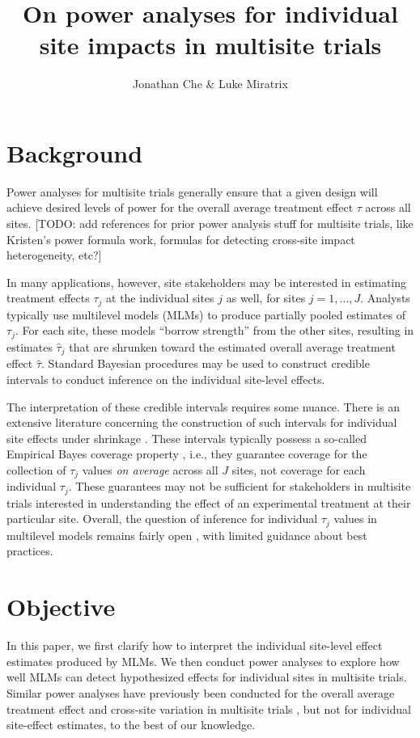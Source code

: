 \documentclass[]{article}
\title{On power analyses for individual site impacts in multisite trials}
\author{Jonathan Che \& Luke Miratrix}
\begin{document}
\maketitle


\section{Background}

Power analyses for multisite trials generally ensure that a given design will achieve desired levels of power for the overall average treatment effect $\tau$ across all sites. [TODO: add references for prior power analysis stuff for multisite trials, like Kristen’s power formula work, formulas for detecting cross-site impact heterogeneity, etc?] 

In many applications, however, site stakeholders may be interested in estimating treatment effects $\tau_j$ at the individual sites $j$ as well, for sites $j = 1, \dots, J$.
Analysts typically use multilevel models (MLMs) to produce partially pooled estimates of $\tau_j$.
For each site, these models ``borrow strength'' from the other sites, resulting in estimates $\hat{\tau}_j$ that are shrunken toward the estimated overall average treatment effect $\hat{\tau}$.
Standard Bayesian procedures may be used to construct credible intervals to conduct inference on the individual site-level effects.

The interpretation of these credible intervals requires some nuance.
There is an extensive literature concerning the construction of such intervals for individual site effects under shrinkage \citep{casella2012shrinkage}.
These intervals typically possess a so-called Empirical Bayes coverage property \citep{morris1983parametric}, i.e., they guarantee coverage for the collection of $\tau_j$ values \textit{on average} across all $J$ sites, not coverage for each individual $\tau_j$.
These guarantees may not be sufficient for stakeholders in multisite trials interested in understanding the effect of an experimental treatment at their particular site.
Overall, the question of inference for individual $\tau_j$ values in multilevel models remains fairly open \citep{armstrong2020robust}, with limited guidance about best practices.

\section{Objective}

In this paper, we first clarify how to interpret the individual site-level effect estimates produced by MLMs.
We then conduct power analyses to explore how well MLMs can detect hypothesized effects for individual sites in multisite trials.
Similar power analyses have previously been conducted for the overall average treatment effect and cross-site variation in multisite trials \citep{raudenbush2000statistical}, but not for individual site-effect estimates, to the best of our knowledge.
\end{document}
